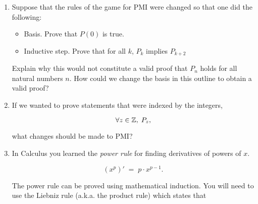 \begin{enumerate}

\wbvfill
  
\hintspagebreak
\workbookpagebreak

\item Suppose that the rules of the game for PMI were changed so that one
did the following:
\begin{itemize}
\item Basis.  Prove that $P(0)$ is true.
\item Inductive step.  Prove that for all $k$, $P_k$ implies $P_{k+2}$
\end{itemize}


\noindent Explain why this would not constitute a valid proof that $P_n$ holds 
for all natural numbers $n$. 
\noindent How could we change the basis in this outline to obtain a valid proof?


\wbvfill

\item If we wanted to prove statements that were indexed by the integers,

\[ \forall z \in {\mathbb Z}, \; P_z, \]

\noindent what changes should be made to PMI?


 \wbvfill
 
 \workbookpagebreak
 
 \item In Calculus you learned the {\em power rule} for finding derivatives of powers of $x$.

 \[ \left( x^p \right)' \; = \; p\cdot x^{p-1}. \] 

 The power rule can be proved using mathematical induction.  You will need to use the Liebniz rule (a.k.a. the product rule)
 which states that 


\end{enumerate}
